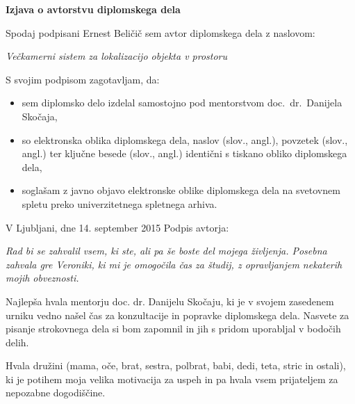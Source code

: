 \documentclass[a4paper, 12pt]{book}
\newcommand{\clearemptydoublepage}{\newpage{\pagestyle{empty}\cleardoublepage}}
\begin{document}
\vspace{2cm}

\clearemptydoublepage

\vspace*{1cm}
\begin{center}
{\Large \textbf{\sc Izjava o avtorstvu diplomskega dela}}
\end{center}

\vspace{1cm}
\noindent Spodaj podpisani Ernest Beličič sem avtor  diplomskega dela z naslovom:

\vspace{0.5cm}
\emph{Večkamerni sistem za lokalizacijo objekta v prostoru}

\vspace{1.5cm}
\noindent S svojim podpisom zagotavljam, da:
\begin{itemize}
	\item sem diplomsko delo izdelal samostojno pod mentorstvom
		doc.\ dr.\ Danijela Skočaja,

	\item	so elektronska oblika diplomskega dela, naslov (slov., angl.), povzetek (slov., angl.) ter ključne besede (slov., angl.) identični s tiskano obliko diplomskega dela,
	\item soglašam z javno objavo elektronske oblike diplomskega dela na svetovnem spletu preko univerzitetnega spletnega arhiva.	
\end{itemize}

\vspace{1cm}
\noindent V Ljubljani, dne 14. september 2015 \hfill Podpis avtorja:

\clearemptydoublepage

\thispagestyle{empty}\mbox{}\vfill\null\it%
Rad bi se zahvalil vsem, ki ste, ali pa še boste del mojega življenja. Posebna zahvala gre Veroniki, ki mi je omogočila čas za študij, z opravljanjem nekaterih mojih obveznosti. 

Najlepša hvala mentorju doc. dr. Danijelu Skočaju, ki je v svojem zasedenem urniku vedno našel čas za konzultacije in popravke diplomskega dela. Nasvete za pisanje strokovnega dela si bom zapomnil in jih s pridom uporabljal v bodočih delih.

Hvala družini (mama, oče, brat, sestra, polbrat, babi, dedi, teta, stric in ostali), ki je potihem moja velika motivacija za uspeh in pa hvala vsem prijateljem za nepozabne dogodiščine.
\end{document}
